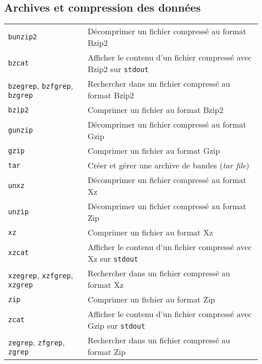 \documentclass[10pt,a4paper]{article}
\begin{document}
\begin{multicols}{2}



\end{multicols}

\newpage

\cheatsheet

\begin{multicols}{2}



\section{Archives et compression des données}
\begin{tabular}{ p{2.75cm} p{8.25cm} }
  \hline 
  \texttt{bunzip2} & Décomprimer un fichier compressé au format Bzip2 \\
  \texttt{bzcat} & Afficher le contenu d'un fichier compressé avec Bzip2 sur \texttt{stdout}\\
  \texttt{bzegrep}, \texttt{bzfgrep}, \texttt{bzgrep} & Rechercher dans un fichier compressé au format Bzip2 \\
  \texttt{bzip2} & Comprimer un fichier au format Bzip2 \\
  \texttt{gunzip} & Décomprimer un fichier compressé au format Gzip \\
  \texttt{gzip} & Comprimer un fichier au format Gzip \\
  \texttt{tar} & Créer et gérer une archive de bandes (\textit{tar file}) \\
  \texttt{unxz} & Décomprimer un fichier compressé au format Xz \\
  \texttt{unzip} & Décomprimer un fichier compressé au format Zip \\
  \texttt{xz} & Comprimer un fichier au format Xz \\
  \texttt{xzcat} & Afficher le contenu d'un fichier compressé avec Xz sur \texttt{stdout} \\
  \texttt{xzegrep}, \texttt{xzfgrep}, \texttt{xzgrep} & Rechercher dans un fichier compressé au format Xz \\
  \texttt{zip} & Comprimer un fichier au format Zip \\
  \texttt{zcat} & Afficher le contenu d'un fichier compressé avec Gzip sur \texttt{stdout} \\
  \texttt{zegrep}, \texttt{zfgrep}, \texttt{zgrep} & Rechercher dans un fichier compressé au format Zip \\
  \hline
\end{tabular}


\end{multicols}
\end{document}
